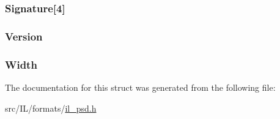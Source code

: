 \hypertarget{struct_p_s_d_h_e_a_d_a5bac2a1102eda8a6453823b7be892818}{
\subsubsection[{Signature}]{ Signature\mbox{[}4\mbox{]}}}\label{struct_p_s_d_h_e_a_d_a5bac2a1102eda8a6453823b7be892818}
\hypertarget{struct_p_s_d_h_e_a_d_a3824b470c86baa88d6ac31a3719e9f9a}{
\subsubsection[{Version}]{ Version}}\label{struct_p_s_d_h_e_a_d_a3824b470c86baa88d6ac31a3719e9f9a}
\hypertarget{struct_p_s_d_h_e_a_d_a4146e7b2b0b4097e0e335f9b348392bf}{
\subsubsection[{Width}]{ Width}}\label{struct_p_s_d_h_e_a_d_a4146e7b2b0b4097e0e335f9b348392bf}


The documentation for this struct was generated from the following file\-:\begin{DoxyCompactItemize}
\item 
src/\-I\-L/formats/\hyperlink{il__psd_8h}{il\-\_\-psd.\-h}\end{DoxyCompactItemize}
